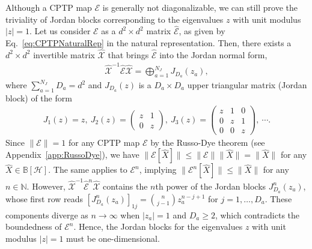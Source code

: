 \documentclass[preprint,pteplogo]{ptephy_v2}%
\numberwithin{equation}{section}
\theoremstyle{definition}
\newcommand{\mc}[1]{\mathcal{#1}}
\newcommand{\mbb}[1]{\mathbb{#1}}
\begin{document}
Although a CPTP map $\mc{E}$ is generally not diagonalizable, we can still prove the triviality of Jordan blocks corresponding to the eigenvalues $z$ with unit modulus $|z|=1$.
Let us consider $\mc{E}$ as a $d^2 \times d^2$ matrix $\hat{\mc{E}}$, as given by Eq.~\eqref{eq:CPTPNaturalRep} in the natural representation. 
Then, there exists a $d^2 \times d^2$ invertible matrix $\hat{\mc{X}}$ that brings $\hat{\mc{E}}$ into the Jordan normal form, 
\begin{align} \label{eq:CPTPJordanForm}
\hat{\mc{X}}^{-1} \hat{\mc{E}} \hat{\mc{X}} = \bigoplus_{a=1}^{N_J} J_{D_a}(z_a),
\end{align}
where $\sum_{a=1}^{N_J} D_a = d^2$ and $J_{D_a}(z)$ is a $D_a \times D_a$ upper triangular matrix (Jordan block) of the form
\begin{align}
J_1(z) = z, \ 
J_2(z) = \begin{pmatrix} z & 1 \\ 0 & z \end{pmatrix}, \ 
J_3(z) = \begin{pmatrix} z & 1 & 0 \\ 0 & z & 1 \\ 0 & 0 & z \end{pmatrix}, \ \cdots.
\end{align}
Since $\| \mc{E} \| = 1$ for any CPTP map $\mc{E}$ by the Russo-Dye theorem (see Appendix~\ref{app:RussoDye}), we have $\| \mc{E}[\hat{X}] \| \leq \| \mc{E} \| \| \hat{X} \| = \| \hat{X} \|$ for any $\hat{X} \in \mbb{B}[\mc{H}]$.
The same applies to $\mc{E}^n$, implying $\| \mc{E}^n[\hat{X}] \| \leq \| \hat{X} \|$ for any $n \in \mbb{N}$.
However, $\hat{\mc{X}}^{-1} \hat{\mc{E}}^n \hat{\mc{X}}$ contains the $n$th power of the Jordan blocks $J^n_{D_a}(z_a)$, whose first row reads $[J^n_{D_a}(z_a)]_{1j} = \binom{n}{j-1} z_a^{n-j+1}$ for $j=1,\ldots,D_a$.
These components diverge as $n \to \infty$ when $|z_a|=1$ and $D_a \geq 2$, which contradicts the boundedness of $\mc{E}^n$.
Hence, the Jordan blocks for the eigenvalues $z$ with unit modulus $|z|=1$ must be one-dimensional. 
\end{document}
